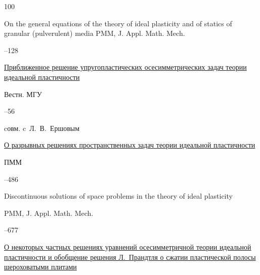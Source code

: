 \begin{thebibliography}{100}
\transl


\paper On the general equations of the theory of ideal plasticity and of statics of granular (pulverulent) media \jour PMM, J. Appl. Math. Mech. 


--128 








\paper \href{https://zbmath.org/?q=an:0088.16403}{Приближенное решение упругопластических осесимметрических задач теории идеальной пластичности}

\jour Вестн. МГУ



–56 

\miscnote cовм. c~Л.~В.~Ершовым 





\paper \href{https://zbmath.org/?q=an:0100.20305}{О разрывных решениях пространственных задач теории идеальной пластичности}

\jour ПММ




–486


\transl


\paper Discontinuous solutions of space problems in the theory of ideal plasticity

\jour PMM, J. Appl. Math. Mech.


--677 








\paper \href{https://zbmath.org/?q=an:0086.39102}{О некоторых частных решениях уравнений осесимметричной теории идеальной пластичности и обобщение решения Л.~Прандтля о сжатии пластической полосы шероховатыми плитами}


\end{thebibliography}
